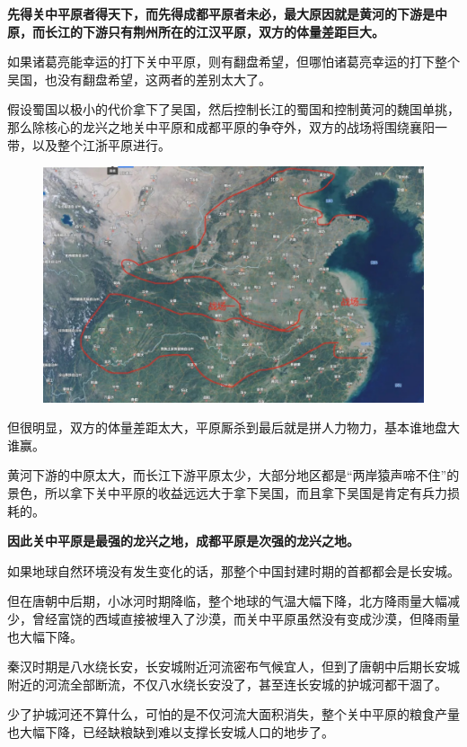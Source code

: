 \documentclass[UTF8, 11pt, oneside]{ctexart}
\newcommand{\zd}[1]{\textbf{\textcolor[RGB]{123,12,0}{#1}}} %
\begin{document}
\zd{先得关中平原者得天下，而先得成都平原者未必，最大原因就是黄河的下游是中原，而长江的下游只有荆州所在的江汉平原，双方的体量差距巨大。}

如果诸葛亮能幸运的打下关中平原，则有翻盘希望，但哪怕诸葛亮幸运的打下整个吴国，也没有翻盘希望，这两者的差别太大了。

假设蜀国以极小的代价拿下了吴国，然后控制长江的蜀国和控制黄河的魏国单挑，那么除核心的龙兴之地关中平原和成都平原的争夺外，双方的战场将围绕襄阳一带，以及整个江浙平原进行。

\begin{figure}[H]
    \centering
    \includegraphics[width=13cm]{2024-08-19-006.jpg}
\end{figure}

但很明显，双方的体量差距太大，平原厮杀到最后就是拼人力物力，基本谁地盘大谁赢。

黄河下游的中原太大，而长江下游平原太少，大部分地区都是“两岸猿声啼不住”的景色，所以拿下关中平原的收益远远大于拿下吴国，而且拿下吴国是肯定有兵力损耗的。

\zd{因此关中平原是最强的龙兴之地，成都平原是次强的龙兴之地。}

如果地球自然环境没有发生变化的话，那整个中国封建时期的首都都会是长安城。

但在唐朝中后期，小冰河时期降临，整个地球的气温大幅下降，北方降雨量大幅减少，曾经富饶的西域直接被埋入了沙漠，而关中平原虽然没有变成沙漠，但降雨量也大幅下降。

秦汉时期是八水绕长安，长安城附近河流密布气候宜人，但到了唐朝中后期长安城附近的河流全部断流，不仅八水绕长安没了，甚至连长安城的护城河都干涸了。

少了护城河还不算什么，可怕的是不仅河流大面积消失，整个关中平原的粮食产量也大幅下降，已经缺粮缺到难以支撑长安城人口的地步了。
\end{document}
